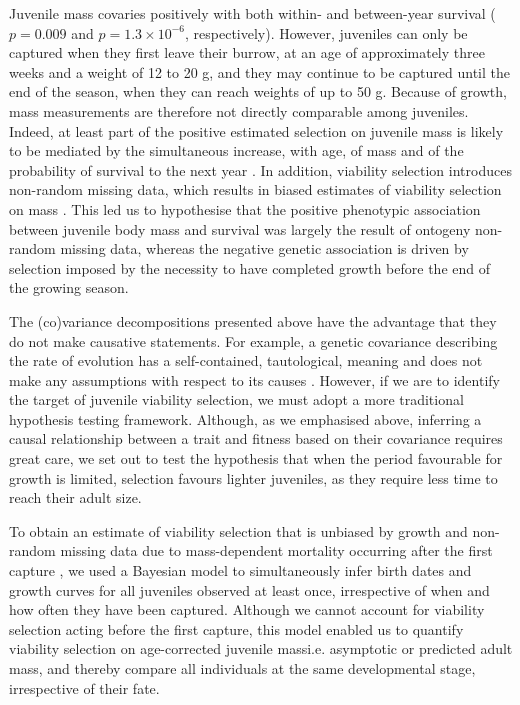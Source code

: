 Juvenile mass covaries positively with both within- and between-year survival ($p=0.009$ and $p=1.3\times10^{-6}$, respectively). However, juveniles can only be captured when they first leave their burrow, at an age of approximately three weeks \parencite{Janeau1997} and a weight of 12 to 20 g, and they may continue to be captured until the end of the season, when they can reach weights of up to 50 g. Because of growth, mass measurements are therefore not directly comparable among juveniles. Indeed, at least part of the positive estimated selection on juvenile mass is likely to be mediated by the simultaneous increase, with age, of mass and of the probability of survival to the next year \parencite{Hadfield2008}. In addition, viability selection introduces non-random missing data, which results in biased estimates of viability selection on mass \parencite{Hadfield2008,Steinsland2014}. This led us to hypothesise that the positive phenotypic association between juvenile body mass and survival was largely the result of ontogeny non-random missing data, whereas the negative genetic association is driven by selection imposed by the necessity to have completed growth before the end of the growing season. 


The (co)variance decompositions presented above have the advantage that they do not make causative statements. For example, a genetic covariance describing the rate of evolution has a self-contained, tautological, meaning and does not make any assumptions with respect to its causes \parencite{Frank2012IV}. However, if we are to identify the target of juvenile viability selection, we must adopt a more traditional hypothesis testing framework. Although, as we emphasised above, inferring a causal relationship between a trait and fitness based on their covariance requires great care, we set out to test the hypothesis that when the period favourable for growth is limited, selection favours lighter juveniles, as they require less time to reach their adult size. 

To obtain an estimate of viability selection that is unbiased by growth and non-random missing data due to mass-dependent mortality occurring after the first capture \parencite{Hadfield2008}, we used a Bayesian model to simultaneously infer birth dates and growth curves for all juveniles observed at least once, irrespective of when and how often they have been captured. Although we cannot account for viability selection acting before the first capture, this model enabled us to quantify viability selection on age-corrected juvenile mass\textemdash i.e. asymptotic or predicted adult mass\textemdash, and thereby compare all individuals at the same developmental stage, irrespective of their fate. 


